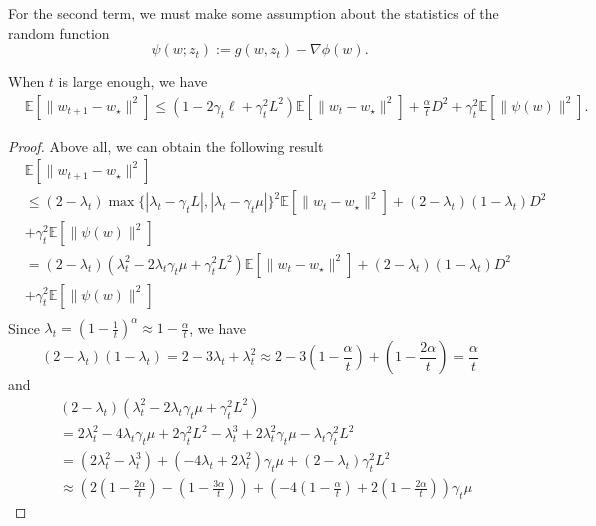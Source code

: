 For the second term, we must make some assumption about the statistics of the random function
\begin{equation}
	\psi(w;z_t):=g(w,z_t)-\nabla \phi(w).
\end{equation}
\begin{lemma}
	When $t$ is large enough, we have
	\begin{equation}
		\begin{split}
			&\mathbb{E}\left[\|w_{t+1}-w_\star\|^2 \right]
			\leq (1-2\gamma_t\ell+\gamma_t^2L^2)\mathbb{E}\left[\|w_t-w_\star\|^2 \right]
			+\frac{\alpha}{t}D^2
			+\gamma_t^2 \mathbb{E} \left[ \|\psi(w)\|^2 \right].
		\end{split}
	\end{equation}
\end{lemma}
\begin{proof}
	Above all, we can obtain the following result
	\begin{equation}
		\begin{split}
			&\mathbb{E}\left[\|w_{t+1}-w_\star\|^2 \right]\\
			&\leq(2-\lambda_t)\max\{ |\lambda_t-\gamma_t L|,|\lambda_t-\gamma_t \mu|  \}^2
			\mathbb{E}\left[\|w_t-w_\star\|^2 \right]+(2-\lambda_t)(1-\lambda_t)D^2\\
			&+\gamma_t^2 \mathbb{E} \left[ \|\psi(w)\|^2 \right]\\
			&=(2-\lambda_t)(\lambda_t^2-2\lambda_t\gamma_t \mu +\gamma_t^2 L^2)
			\mathbb{E}\left[\|w_t-w_\star\|^2 \right]+(2-\lambda_t)(1-\lambda_t)D^2\\
			&+\gamma_t^2 \mathbb{E} \left[ \|\psi(w)\|^2 \right]\\
		\end{split}
	\end{equation}
	Since $\lambda_t=(1-\frac{1}{t})^\alpha\approx 1-\frac{\alpha}{t}$, we have
	$$
	(2-\lambda_t)(1-\lambda_t)
	=2-3\lambda_t+\lambda_t^2
	\approx 2-3(1-\frac{\alpha}{t})+(1-\frac{2\alpha}{t})
	=\frac{\alpha}{t}
	$$
	and
	\begin{align}
		&(2-\lambda_t)(\lambda_t^2-2\lambda_t\gamma_t \mu +\gamma_t^2 L^2)\\
		&=2\lambda_t^2-4\lambda_t\gamma_t\mu+2\gamma_t^2 L^2
		-\lambda_t^3+2\lambda_t^2 \gamma_t\mu-\lambda_t\gamma_t^2 L^2\\
		&=(2\lambda_t^2-\lambda_t^3)+(-4\lambda_t+2\lambda_t^2)\gamma_t\mu
		+(2-\lambda_t)\gamma_t^2 L^2\\
		&\approx (2(1-\frac{2\alpha}{t})-(1-\frac{3\alpha}{t}))
		+(-4(1-\frac{\alpha}{t})+2(1-\frac{2\alpha}{t}))\gamma_t\mu

\end{align}
\end{proof}
